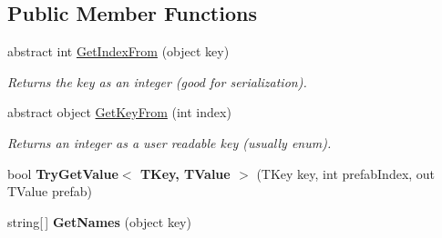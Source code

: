 \subsection*{Public Member Functions}
\begin{DoxyCompactItemize}
\item 
abstract int \hyperlink{class_skyrates_1_1_client_1_1_util_1_1_prefab_list_ab5db2b1922c216f1c300e3e368a576db}{Get\-Index\-From} (object key)
\begin{DoxyCompactList}\small\item\em Returns the key as an integer (good for serialization). \end{DoxyCompactList}\item 
abstract object \hyperlink{class_skyrates_1_1_client_1_1_util_1_1_prefab_list_a462cb1bdd78ba22bd277874dc6b9239e}{Get\-Key\-From} (int index)
\begin{DoxyCompactList}\small\item\em Returns an integer as a user readable key (usually enum). \end{DoxyCompactList}\item 
\hypertarget{class_skyrates_1_1_client_1_1_util_1_1_prefab_list_a06b9060646fda7f073bf8f6308d31d36}{bool {\bfseries Try\-Get\-Value$<$ T\-Key, T\-Value $>$} (T\-Key key, int prefab\-Index, out T\-Value prefab)}\label{class_skyrates_1_1_client_1_1_util_1_1_prefab_list_a06b9060646fda7f073bf8f6308d31d36}

\item 
\hypertarget{class_skyrates_1_1_client_1_1_util_1_1_prefab_list_ad726e75727411756dc76a63eb40fd223}{string\mbox{[}$\,$\mbox{]} {\bfseries Get\-Names} (object key)}\label{class_skyrates_1_1_client_1_1_util_1_1_prefab_list_ad726e75727411756dc76a63eb40fd223}

\end{DoxyCompactItemize}

